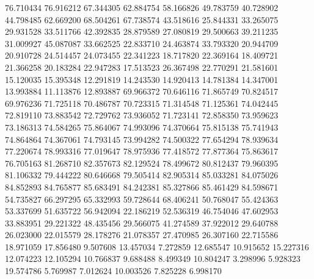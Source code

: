 76.710434
76.916212
67.344305
62.884754
58.166826
49.783759
40.728902
44.798485
62.669200
68.504261
67.738574
43.518616
25.844331
33.265075
29.931528
33.511766
42.392835
28.879589
27.080819
29.500663
39.211235
31.009927
45.087087
33.662525
22.833710
24.463874
33.793320
20.944709
20.910728
24.514457
24.073455
22.341223
18.717820
22.369164
18.409721
21.366258
20.183284
22.947283
17.513523
26.367498
22.770291
21.581601
15.120035
15.395348
12.291819
14.243530
14.920413
14.781384
14.347001
13.993884
11.113876
12.893887
69.966372
70.646116
71.865749
70.824517
69.976236
71.725118
70.486787
70.723315
71.314548
71.125361
74.042445
72.819110
73.883542
72.729762
73.936052
71.723141
72.858350
73.959623
73.186313
74.584265
75.864067
74.993096
74.370664
75.815138
75.741943
74.864864
74.367061
74.793145
73.994282
74.500322
77.654294
78.939634
77.220674
78.993316
77.019647
78.975936
77.418572
77.877364
75.863617
76.705163
81.268710
82.357673
82.129524
78.499672
80.812437
79.960395
81.106332
79.444222
80.646668
79.505414
82.905314
85.033281
84.075026
84.852893
84.765877
85.683491
84.242381
85.327866
85.461429
84.598671
54.735827
66.297295
65.332993
59.728644
68.406241
50.768047
55.424363
53.337699
51.635722
56.942094
22.186219
52.536319
46.754046
47.602953
33.883951
29.221322
48.435456
29.566075
41.274589
37.922012
29.640788
26.023000
22.015579
28.178276
21.078357
27.470985
26.307160
22.715586
18.971059
17.856480
9.507608
13.457034
7.272859
12.685547
10.915652
15.227316
12.074223
12.105294
10.766837
9.688488
8.499349
10.804247
3.298996
5.928323
19.574786
5.769987
7.012624
10.003526
7.825228
6.998170
